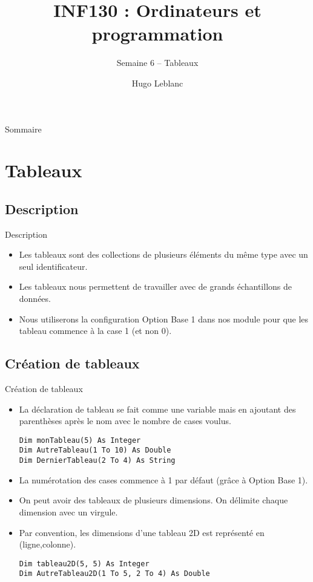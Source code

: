 \documentclass[aspectratio=169,usenames,dvipsnames]{beamer}
\title{INF130 : Ordinateurs et programmation}
\subtitle{Semaine 6 – Tableaux}
\author{Hugo Leblanc}
\begin{document}
    \maketitle

    \begin{frame}{Sommaire}
        \tableofcontents
    \end{frame}

    \section{Tableaux}
    \subsection{Description}
    \begin{frame}{Description}
        \begin{itemize}
            \item Les tableaux sont des collections de plusieurs éléments du même type avec un seul identificateur.
            \item Les tableaux nous permettent de travailler avec de grands échantillons de données.
            \item Nous utiliserons la configuration Option Base 1 dans nos module pour que les tableau commence à la case 1 (et non 0).
        \end{itemize}
    \end{frame}
    \subsection{Création de tableaux}
    \begin{frame}[fragile]{Création de tableaux}
        \begin{itemize}
            \item La déclaration de tableau se fait comme une variable mais en ajoutant des parenthèses après le nom avec le nombre de cases voulus.
\begin{lstlisting}
Dim monTableau(5) As Integer
Dim AutreTableau(1 To 10) As Double
Dim DernierTableau(2 To 4) As String
\end{lstlisting}
            \item La numérotation des cases commence à 1 par défaut (grâce à Option Base 1).
            \item On peut avoir des tableaux de plusieurs dimensions. On délimite chaque dimension avec un virgule.
            \item Par convention, les dimensions d’une tableau 2D est représenté en (ligne,colonne).
\begin{lstlisting}
Dim tableau2D(5, 5) As Integer
Dim AutreTableau2D(1 To 5, 2 To 4) As Double
\end{lstlisting}        
        \end{itemize}
    \end{frame}
\end{document}
